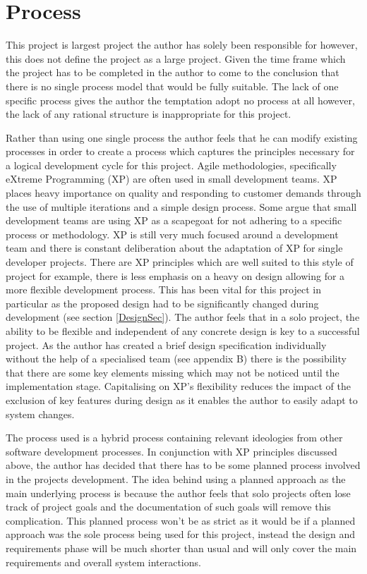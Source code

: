 \chapter{Process}
\label{processSec}
This project is largest project the author has solely been responsible for however, this does not define the project as a large project. Given the time frame which the project has to be completed in the author to come to the conclusion that there is no single process model that would be fully suitable. The lack of one specific process gives the author the temptation adopt no process at all however, the lack of any rational structure is inappropriate for this project.

Rather than using one single process the author feels that he can modify existing processes in order to create a process which captures the principles necessary for a logical development cycle for this project. Agile methodologies, specifically eXtreme Programming (XP) are often used in small development teams. XP places heavy importance on quality and responding to customer demands through the use of multiple iterations and a simple design process. Some argue that small development teams are using XP as a scapegoat for not adhering to a specific process or methodology. XP is still very much focused around a development team and there is constant deliberation about the adaptation of XP for single developer projects\cite{XP:forone}. There are XP principles which are well suited to this style of project for example, there is less emphasis on a heavy on design allowing for a more flexible development process. This has been vital for this project in particular as the proposed design had to be significantly changed during development (see section \ref{DesignSec}). The author feels that in a solo project, the ability to be flexible and independent of any concrete design is key to a successful project. As the author has created a brief design specification individually without the help of a specialised team (see appendix B) there is the possibility that there are some key elements missing which may not be noticed until the implementation stage. Capitalising on XP's flexibility reduces the impact of the exclusion of key features during design as it enables the author to easily adapt to system changes. 

The process used is a hybrid process containing relevant ideologies from other software development processes. In conjunction with XP principles discussed above, the author has decided that there has to be some planned process involved in the projects development. The idea behind using a planned approach as the main underlying process is because the author feels that solo projects often lose track of project goals and the documentation of such goals will remove this complication. This planned process won’t be as strict as it would be if a planned approach was the sole process being used for this project, instead the design and requirements phase will be much shorter than usual and will only cover the main requirements and overall system interactions. 


